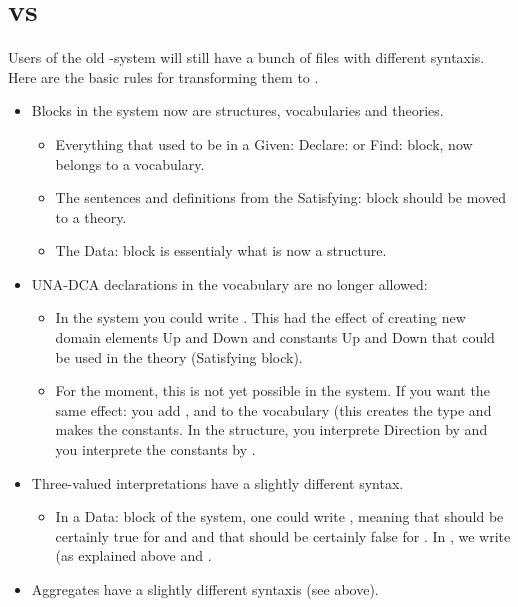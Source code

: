 \section{\idptwo vs \idpthree}
Users of the old \idptwo-system will still have a bunch of files with different syntaxis. Here are the basic rules for transforming them to \idpthree.
\begin{itemize}
	\item Blocks in the \idptwo system now are structures, vocabularies and theories.
		\begin{itemize}
			\item Everything that used to be in a Given: Declare: or Find: block, now belongs to a vocabulary.
			\item The sentences and definitions from the Satisfying: block should be moved to a theory.
			\item The Data: block is essentialy what is now a structure.
		\end{itemize}
	\item UNA-DCA declarations in the vocabulary are no longer allowed:
		\begin{itemize}
			\item In the \idptwo system you could write . This had the effect of creating new domain elements Up and Down and constants Up and Down that could be used in the theory (Satisfying block).
			\item For the moment, this is not yet possible in the \idpthree system. If you want the same effect: you add ,  and  to the vocabulary (this creates the type and makes the constants. In the structure, you interprete Direction by  and you interprete the constants by .
		\end{itemize}
	\item Three-valued interpretations have a slightly different syntax.
		\begin{itemize}
			\item In a Data: block of the \idptwo system, one could write , meaning that  should be certainly true for  and  and that  should be certainly false for . In \idpthree, we write (as explained above  and .
		\end{itemize}
	\item Aggregates have a slightly different syntaxis (see above).


\end{itemize}